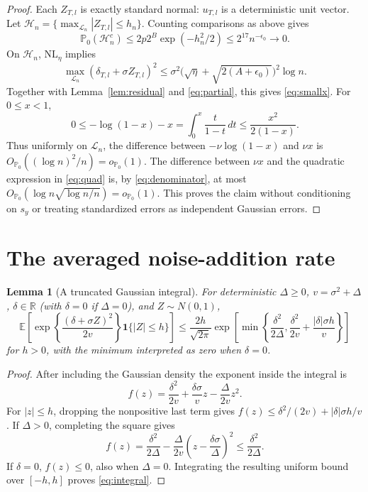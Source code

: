 \documentclass[11pt]{article}
\newtheorem{lemma}{Lemma}
\theoremstyle{remark}\newtheorem{remark}{Remark}
\newcommand{\PP}{\mathbb P_0}
\newcommand{\op}{o_{\PP}}
\newcommand{\Op}{O_{\PP}}
\newcommand{\ind}{\mathbf 1}
\newcommand{\Lc}{\mathcal L_n}
\begin{document}
\begin{proof}
Each $Z_{T,l}$ is exactly standard normal: $u_{T,l}$ is a deterministic
unit vector. Let $\mathcal H_n=\{\max_{\Lc}|Z_{T,l}|\le h_n\}$. Counting
comparisons as above gives
\begin{equation}\label{eq:tail}
 \PP(\mathcal H_n^c)\le2p2^B\exp(-h_n^2/2)
 \le2^{17}n^{-\epsilon_0}\to0.
\end{equation}
On $\mathcal H_n$, $\mathrm{NL}_\eta$ implies
\[
 \max_{\Lc}(\delta_{T,l}+\sigma Z_{T,l})^2
 \le\sigma^2\bigl(\sqrt\eta+\sqrt{2(A+\epsilon_0)}\bigr)^2\log n.
\]
Together with Lemma~\ref{lem:residual} and \eqref{eq:partial}, this gives
\eqref{eq:smallx}. For $0\le x<1$,
\[
 0\le-\log(1-x)-x=\int_0^x\frac{t}{1-t}\,dt
 \le\frac{x^2}{2(1-x)}.
\]
Thus uniformly on $\Lc$, the difference between $-\nu\log(1-x)$ and
$\nu x$ is $\Op((\log n)^2/n)=\op(1)$.
The difference between $\nu x$ and the quadratic expression in
\eqref{eq:quad} is, by \eqref{eq:denominator}, at most
$\Op(\log n\sqrt{\log n/n})=\op(1)$.
This proves the claim without conditioning on $s_y$ or treating standardized
errors as independent Gaussian errors.
\end{proof}

\section{The averaged noise-addition rate}

\begin{lemma}[A truncated Gaussian integral]\label{lem:integral}
For deterministic $\Delta\ge0$, $v=\sigma^2+\Delta$,
$\delta\in\mathbb R$ (with $\delta=0$ if $\Delta=0$), and $Z\sim N(0,1)$,
\begin{equation}\label{eq:integral}
 \mathbb E\left[
 \exp\!\left\{\frac{(\delta+\sigma Z)^2}{2v}\right\}
 \ind\{|Z|\le h\}\right]
 \le\frac{2h}{\sqrt{2\pi}}\exp\left[
 \min\left\{\frac{\delta^2}{2\Delta},
 \frac{\delta^2}{2v}+\frac{|\delta|\sigma h}{v}\right\}\right]
\end{equation}
for $h>0$, with the minimum interpreted as zero when $\delta=0$.
\end{lemma}

\begin{proof}
After including the Gaussian density the exponent inside the integral is
\[
 f(z)=\frac{\delta^2}{2v}+\frac{\delta\sigma}{v}z
          -\frac{\Delta}{2v}z^2.
\]
For $|z|\le h$, dropping the nonpositive last term gives
$f(z)\le\delta^2/(2v)+|\delta|\sigma h/v$. If $\Delta>0$, completing
the square gives
\[
 f(z)=\frac{\delta^2}{2\Delta}
       -\frac{\Delta}{2v}\left(z-\frac{\delta\sigma}{\Delta}\right)^2
 \le\frac{\delta^2}{2\Delta}.
\]
If $\delta=0$, $f(z)\le0$, also when $\Delta=0$.
Integrating the resulting uniform bound over $[-h,h]$ proves
\eqref{eq:integral}.
\end{proof}
\end{document}
